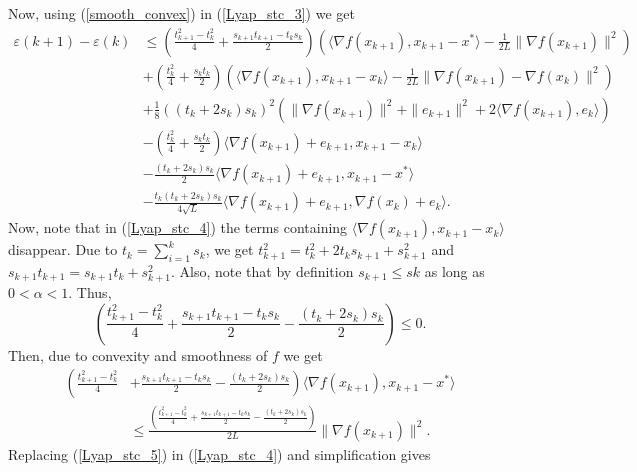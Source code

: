 \documentclass{article}
\theoremstyle{plain}
\theoremstyle{definition}
\theoremstyle{remark}
\begin{document}
    Now, using (\ref{smooth_convex}) in (\ref{Lyap_stc_3}) we get
    \begin{align}\label{Lyap_stc_4}
         \varepsilon(k+1)-\varepsilon(k)&\leq (\frac{t_{k+1}^2-t_k^2}{4}+\frac{s_{k+1}t_{k+1}-t_ks_k}{2})(\langle \nabla f(x_{k+1}),x_{k+1}-x^* \rangle-\frac{1}{2L}\|\nabla f(x_{k+1})\|^2)\nonumber\\
         & +(\frac{t_{k}^2}{4}+\frac{s_{k}t_{k}}{2})(\langle \nabla f(x_{k+1}),x_{k+1}-x_k \rangle-\frac{1}{2L}\|\nabla f(x_{k+1})-\nabla f(x_k)\|^2)\nonumber\\
         & +\frac{1}{8}((t_k+2s_k)s_k)^2(\|\nabla f(x_{k+1})\|^2+\|e_{k+1}\|^2+2\langle \nabla f(x_{k+1}) ,e_k \rangle) \nonumber\\
         & -(\frac{t_k^2}{4}+\frac{s_kt_k}{2})\langle \nabla f(x_{k+1})+e_{k+1},x_{k+1}-x_k\rangle\nonumber\\
         &-\frac{(t_k+2s_k)s_k}{2}\langle \nabla f(x_{k+1})+e_{k+1},x_{k+1}-x^*\rangle\nonumber\\
         & -\frac{t_k(t_k+2s_k)s_k}{4\sqrt{L}}\langle \nabla f(x_{k+1})+e_{k+1}, \nabla f(x_k)+e_k \rangle.
         \end{align}
         Now, note that in (\ref{Lyap_stc_4}) the terms containing $\langle \nabla f(x_{k+1}),x_{k+1}-x_k \rangle$ disappear. Due to $t_k=\sum_{i=1}^k s_k$, we get $t_{k+1}^2=t_k^2 + 2t_ks_{k+1}+ s_{k+1}^2$ and $s_{k+1}t_{k+1}=s_{k+1}t_k+s_{k+1}^2$. Also, note  that by definition $s_{k+1}\leq s{k}$ as long as $0<\alpha<1$. Thus,
         $$\left(\frac{t_{k+1}^2-t_k^2}{4}+\frac{s_{k+1}t_{k+1}-t_ks_k}{2} -\frac{(t_k+2s_k)s_k}{2}\right)\leq 0.$$
         Then, due to convexity and smoothness of $f$ we get
         \begin{align}\label{Lyap_stc_5}
             \left(\frac{t_{k+1}^2-t_k^2}{4}\right.&\left.+\frac{s_{k+1}t_{k+1}-t_ks_k}{2} -\frac{(t_k+2s_k)s_k}{2}\right)\langle \nabla f(x_{k+1}), x_{k+1}-x^* \rangle\nonumber\\
             &\leq \frac{\left(\frac{t_{k+1}^2-t_k^2}{4}+\frac{s_{k+1}t_{k+1}-t_ks_k}{2} -\frac{(t_k+2s_k)s_k}{2}\right)}{2L}\|\nabla f(x_{k+1})\|^2.
         \end{align} 
        Replacing (\ref{Lyap_stc_5}) in (\ref{Lyap_stc_4}) and simplification gives
\end{document}
